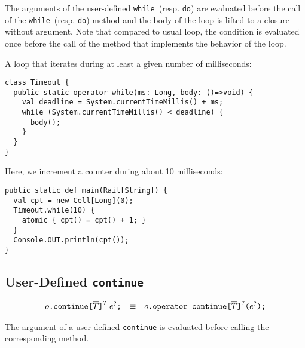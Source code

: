 The arguments of the user-defined \verb+while+~(resp. \verb+do+) are
evaluated before the call of the \verb+while+~(resp. \verb+do+) method
and the body of the loop is lifted to a closure without argument.
%
Note that compared to usual loop, the condition is evaluated once
before the call of the method that implements the behavior of the
loop.


\begin{example}
  A loop that iterates during at least a given number of milliseconds:
\begin{verbatim}
class Timeout {
  public static operator while(ms: Long, body: ()=>void) {
    val deadline = System.currentTimeMillis() + ms;
    while (System.currentTimeMillis() < deadline) {
      body();
    }
  }
}
\end{verbatim}
Here, we increment a counter during about 10 milliseconds:
\begin{verbatim}
public static def main(Rail[String]) {
  val cpt = new Cell[Long](0);
  Timeout.while(10) {
    atomic { cpt() = cpt() + 1; }
  }
  Console.OUT.println(cpt());
}
\end{verbatim}

\end{example}

\subsection{User-Defined  \texttt{continue}}

$$
\begin{array}{rcl}
  {o}\texttt{.continue}\texttt{[}{\overline{T}}\texttt{]}^?~{e}^?\texttt{;}
  & \equiv &
  {o}\texttt{.operator continue}\texttt{[}{\overline{T}}\texttt{]}^?\texttt{(}{e}^?\texttt{);}
\end{array}
$$

The argument of a user-defined \verb+continue+ is evaluated before
calling the corresponding method.

